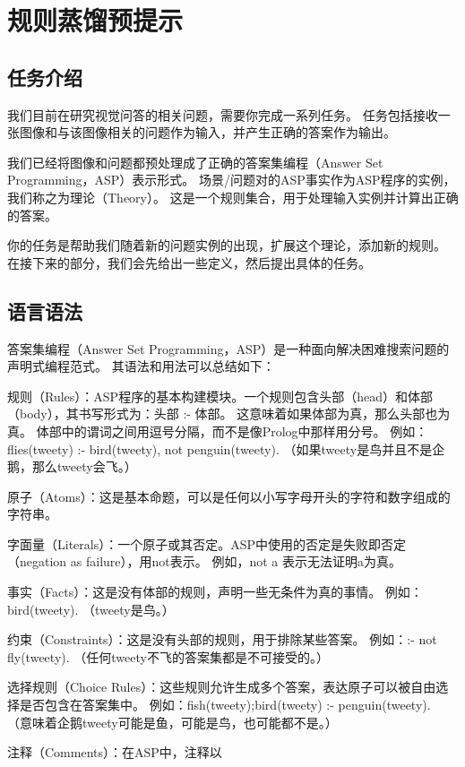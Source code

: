 \section{规则蒸馏预提示}
\label{appendix:preprompt}
\subsection{任务介绍}
\label{appendix:task-introduction}
我们目前在研究视觉问答的相关问题，需要你完成一系列任务。
任务包括接收一张图像和与该图像相关的问题作为输入，并产生正确的答案作为输出。

我们已经将图像和问题都预处理成了正确的答案集编程（Answer Set Programming，ASP）表示形式。
场景/问题对的ASP事实作为ASP程序的实例，我们称之为理论（Theory）。
这是一个规则集合，用于处理输入实例并计算出正确的答案。

你的任务是帮助我们随着新的问题实例的出现，扩展这个理论，添加新的规则。
在接下来的部分，我们会先给出一些定义，然后提出具体的任务。
\subsection{语言语法}
\label{appendix:asp-grammar}
答案集编程（Answer Set Programming，ASP）是一种面向解决困难搜索问题的声明式编程范式。
其语法和用法可以总结如下：

规则（Rules）：ASP程序的基本构建模块。一个规则包含头部（head）和体部（body），其书写形式为：头部 :- 体部。
这意味着如果体部为真，那么头部也为真。
体部中的谓词之间用逗号分隔，而不是像Prolog中那样用分号。
例如：flies(tweety) :- bird(tweety), not penguin(tweety). （如果tweety是鸟并且不是企鹅，那么tweety会飞。）

原子（Atoms）：这是基本命题，可以是任何以小写字母开头的字符和数字组成的字符串。

字面量（Literals）：一个原子或其否定。ASP中使用的否定是失败即否定（negation as failure），用not表示。
例如，not a 表示无法证明a为真。

事实（Facts）：这是没有体部的规则，声明一些无条件为真的事情。
例如：bird(tweety). （tweety是鸟。）

约束（Constraints）：这是没有头部的规则，用于排除某些答案。
例如：:- not fly(tweety). （任何tweety不飞的答案集都是不可接受的。）

选择规则（Choice Rules）：这些规则允许生成多个答案，表达原子可以被自由选择是否包含在答案集中。
例如：{fish(tweety);bird(tweety)} :- penguin(tweety). （意味着企鹅tweety可能是鱼，可能是鸟，也可能都不是。）

注释（Comments）：在ASP中，注释以%


